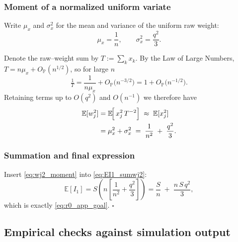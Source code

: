 \subsubsection*{Moment of a normalized uniform variate}

Write $\mu_{x}$ and $\sigma_{x}^{2}$ for the mean and variance of the
uniform raw weight:
\[
  \mu_{x} = \frac{1}{n}, 
  \qquad
  \sigma_{x}^{2} = \frac{q^{2}}{3}.
\]

Denote the raw–weight sum by $T := \sum_{k} x_{k}$.  By the Law of Large Numbers, $T = n\mu_{x}+O_{\mathbb{P}}(n^{1/2})$, so for large $n$
\begin{equation}
  \tfrac1T = \frac{1}{n\mu_{x}}
             + O_{\mathbb{P}}\!\bigl(n^{-3/2}\bigr)
           = 1 + O_{\mathbb{P}}\!\bigl(n^{-1/2}\bigr).
\end{equation}
Retaining terms up to $O(q^{2})$ and $O(n^{-1})$ we therefore have
\begin{align}
  \mathbb{E}[w_{j}^{2}]
    &= \mathbb{E}\!\Bigl[\,x_{j}^{2}\,T^{-2}\Bigr]
      \;\approx\;
      \mathbb{E}[x_{j}^{2}]
      \notag\\
    &= \mu_{x}^{2} + \sigma_{x}^{2}
      \;=\;
      \frac{1}{n^{2}} \;+\; \frac{q^{2}}{3}.
      \label{eq:wj2_moment}
\end{align}

\subsubsection*{Summation and final expression}

Insert \eqref{eq:wj2_moment} into
\eqref{eq:EI1_sumwj2}:
\begin{equation}
  \mathbb{E}[I_{1}]
    = S
      \left(
        n\!\left[\frac{1}{n^{2}} + \frac{q^{2}}{3}\right]
      \right)
    = 
      \frac{S}{n} \;+\; \frac{n\,S\,q^{2}}{3},
\end{equation}
which is exactly \eqref{eq:r0_app_goal}.  \hfill$\square$

\subsection{Empirical checks against simulation output}%
\label{app:figures}

